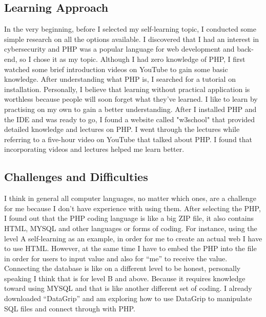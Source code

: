 \documentclass[a4paper, 11pt]{report}
\begin{document}
\subsection{Learning Approach}

In the very beginning, before I selected my self-learning topic, I conducted some simple research on all the options available. I discovered that I had an interest in cybersecurity and PHP was a popular language for web development and back-end, so I chose it as my topic. Although I had zero knowledge of PHP, I first watched some brief introduction videos on YouTube to gain some basic knowledge. After understanding what PHP is, I searched for a tutorial on installation. Personally, I believe that learning without practical application is worthless because people will soon forget what they've learned. I like to learn by practising on my own to gain a better understanding. After I installed PHP and the IDE and was ready to go, I found a website called "w3school" that provided detailed knowledge and lectures on PHP. I went through the lectures while referring to a five-hour video on YouTube that talked about PHP. I found that incorporating videos and lectures helped me learn better.

\subsection{Challenges and Difficulties}

I think in general all computer languages, no matter which ones, are a challenge for me because I don’t have experience with using them. After selecting the PHP, I found out that the PHP coding language is like a big ZIP file, it also contains HTML, MYSQL and other languages or forms of coding. For instance, using the level A self-learning as an example, in order for me to create an actual web I have to use HTML. However, at the same time I have to embed the PHP into the file in order for users to input value and also for “me” to receive the value. Connecting the database is like on a different level to be honest, personally speaking I think that is for level B and above. Because it requires knowledge toward using MYSQL and that is like another different set of coding. I already downloaded “DataGrip” and am exploring how to use DataGrip to manipulate SQL files and connect through with PHP.
\end{document}
